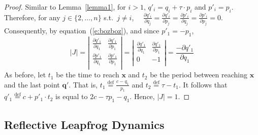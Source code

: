 \documentclass{article} %
\newcommand{\bvec}[1]{\textbf{#1}}
\begin{document}
\begin{proof}
Similar to Lemma~\ref{lemma1},
for $i>1$,   
$
q'_{i}=q_{i}+\tau\cdot p_{i}
$
and
$
p'_{i} =p_{i}
$.
Therefore, for any
$j \in \{2, \ldots, n\}$ s.t.\ $j \neq i$,
$\quad
\frac{\partial q'_{i}}
{\partial q_{j}}=
\frac{\partial q'_{i}}
{\partial p_{j}}=
\frac{\partial p'_{i}}
{\partial q_{j}}=
\frac{\partial p'_{i}}
{\partial p_{j}}=0
$.
Consequently, by equation~(\ref{e:bozboz}), 
and since $p'_1 = -p_1$,  
\begin{equation}\label{e:jiji}
|J| =
\left|\begin{array}{cc}
\frac{\partial q'_{1}}{\partial q_{1}} & \frac{\partial q'_{1}}{\partial p_{1}} \\
\frac{\partial p'_{1}}{\partial q_{1}} & \frac{\partial p'_{1}}{\partial p_{1}} \\
\end{array}\right|
=
\left|\begin{array}{cc}
\frac{\partial q'_{1}}{\partial q_{1}} & \frac{\partial q'_{1}}{\partial p_{1}} \\
0 & -1 \\
\end{array}\right| 
= 
\frac{-\partial q'_{1}}{\partial q_{1}}
\end{equation}
%
As before, let $t_1$ be the time to reach $\bvec{x}$ and $t_2$ be the period between reaching $\bvec{x}$ and the last point $\bvec{q}'$. That is,
$t_1 \overset{\text{def}}= \frac{c - q_{1}}{p_{1}}$
and
$
t_2 \overset{\text{def}}=\tau - t_1
$.
It follows that
$q'_1 \overset{\text{def}}= c + p'_1 \cdot t_2$ 
is equal to $2c - \tau p_1 - q_{1}$.
Hence, $|J| = 1$.
\end{proof}

\subsection{Reflective Leapfrog Dynamics}
\end{document}

